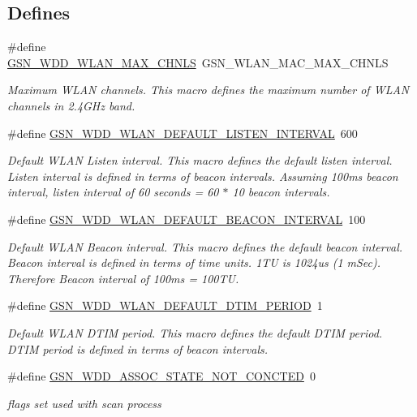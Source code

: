 \subsection*{Defines}
\begin{DoxyCompactItemize}
\item 
\#define \hyperlink{a00677_ga3d65e35c6d96f765b7e4c83373d90c57}{GSN\_\-WDD\_\-WLAN\_\-MAX\_\-CHNLS}~GSN\_\-WLAN\_\-MAC\_\-MAX\_\-CHNLS
\begin{DoxyCompactList}\small\item\em Maximum WLAN channels. This macro defines the maximum number of WLAN channels in 2.4GHz band. \end{DoxyCompactList}\item 
\#define \hyperlink{a00677_ga1cd4e2c2ef057685d974d4a865e5f934}{GSN\_\-WDD\_\-WLAN\_\-DEFAULT\_\-LISTEN\_\-INTERVAL}~600
\begin{DoxyCompactList}\small\item\em Default WLAN Listen interval. This macro defines the default listen interval. Listen interval is defined in terms of beacon intervals. Assuming 100ms beacon interval, listen interval of 60 seconds = 60 $\ast$ 10 beacon intervals. \end{DoxyCompactList}\item 
\#define \hyperlink{a00677_gab70cb03c6369e528aaa34311acfc1726}{GSN\_\-WDD\_\-WLAN\_\-DEFAULT\_\-BEACON\_\-INTERVAL}~100
\begin{DoxyCompactList}\small\item\em Default WLAN Beacon interval. This macro defines the default beacon interval. Beacon interval is defined in terms of time units. 1TU is 1024us (1 mSec). Therefore Beacon interval of 100ms = 100TU. \end{DoxyCompactList}\item 
\#define \hyperlink{a00677_ga406fd2f9962a7ec83167cd6bcafdd221}{GSN\_\-WDD\_\-WLAN\_\-DEFAULT\_\-DTIM\_\-PERIOD}~1
\begin{DoxyCompactList}\small\item\em Default WLAN DTIM period. This macro defines the default DTIM period. DTIM period is defined in terms of beacon intervals. \end{DoxyCompactList}\item 
\#define \hyperlink{a00677_ga5f07a309e776550d66ddc892d44295ae}{GSN\_\-WDD\_\-ASSOC\_\-STATE\_\-NOT\_\-CONCTED}~0
\begin{DoxyCompactList}\small\item\em flags set used with scan process \end{DoxyCompactList}\item 

\end{DoxyCompactItemize}
